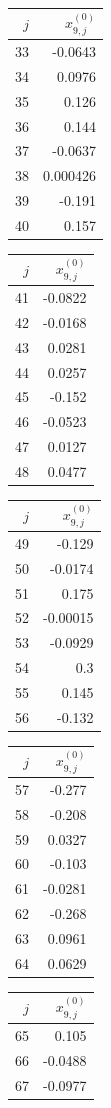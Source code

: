 {\begin{tabular}[t]{r|r}
$j$ & $x^{(0)}_{9,j}$ \\\hline
33 & -0.0643 \\
34 & 0.0976 \\
35 & 0.126 \\
36 & 0.144 \\
37 & -0.0637 \\
38 & 0.000426 \\
39 & -0.191 \\
40 & 0.157
\end{tabular}\kern4pt
\begin{tabular}[t]{r|r}
$j$ & $x^{(0)}_{9,j}$ \\\hline
41 & -0.0822 \\
42 & -0.0168 \\
43 & 0.0281 \\
44 & 0.0257 \\
45 & -0.152 \\
46 & -0.0523 \\
47 & 0.0127 \\
48 & 0.0477
\end{tabular}\kern4pt
\begin{tabular}[t]{r|r}
$j$ & $x^{(0)}_{9,j}$ \\\hline
49 & -0.129 \\
50 & -0.0174 \\
51 & 0.175 \\
52 & -0.00015 \\
53 & -0.0929 \\
54 & 0.3 \\
55 & 0.145 \\
56 & -0.132
\end{tabular}\kern4pt
\begin{tabular}[t]{r|r}
$j$ & $x^{(0)}_{9,j}$ \\\hline
57 & -0.277 \\
58 & -0.208 \\
59 & 0.0327 \\
60 & -0.103 \\
61 & -0.0281 \\
62 & -0.268 \\
63 & 0.0961 \\
64 & 0.0629
\end{tabular}\kern4pt
\begin{tabular}[t]{r|r}
$j$ & $x^{(0)}_{9,j}$ \\\hline
65 & 0.105 \\
66 & -0.0488 \\
67 & -0.0977 \\

\end{tabular}}
